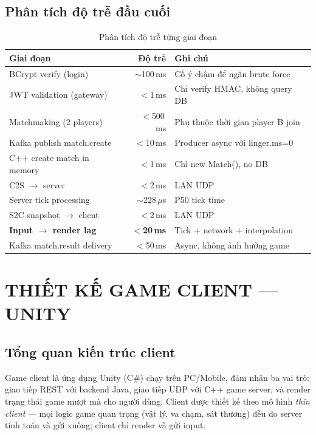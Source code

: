 \documentclass[12pt,a4paper]{report}
\begin{document}
\section{Phân tích độ trễ đầu cuối}

\begin{table}[H]
\centering
\caption{Phân tích độ trễ từng giai đoạn}
\label{tab:latencydetail}
\begin{tabularx}{\textwidth}{lrX}
\toprule
\textbf{Giai đoạn} & \textbf{Độ trễ} & \textbf{Ghi chú} \\
\midrule
BCrypt verify (login)       & $\sim$100\,ms & Cố ý chậm để ngăn brute force \\
JWT validation (gateway)    & $<$1\,ms      & Chỉ verify HMAC, không query DB \\
Matchmaking (2 players)     & $<$500\,ms    & Phụ thuộc thời gian player B join \\
Kafka publish match.create  & $<$10\,ms     & Producer async với linger.ms=0 \\
C++ create match in memory  & $<$1\,ms      & Chỉ new Match(), no DB \\
C2S $\rightarrow$ server    & $<$2\,ms      & LAN UDP \\
Server tick processing      & $\sim$228\,$\mu$s & P50 tick time \\
S2C snapshot $\rightarrow$ client & $<$2\,ms & LAN UDP \\
\textbf{Input $\rightarrow$ render lag} & \textbf{$<$20\,ms} & Tick + network + interpolation \\
Kafka match.result delivery & $<$50\,ms     & Async, không ảnh hưởng game \\
\bottomrule
\end{tabularx}
\end{table}

\chapter{THIẾT KẾ GAME CLIENT --- UNITY}

\section{Tổng quan kiến trúc client}

Game client là ứng dụng Unity (C\#) chạy trên PC/Mobile, đảm nhận ba vai trò: giao tiếp REST với backend Java, giao tiếp UDP với C++ game server, và render trạng thái game mượt mà cho người dùng. Client được thiết kế theo mô hình \textit{thin client} --- mọi logic game quan trọng (vật lý, va chạm, sát thương) đều do server tính toán và gửi xuống; client chỉ render và gửi input.
\end{document}
